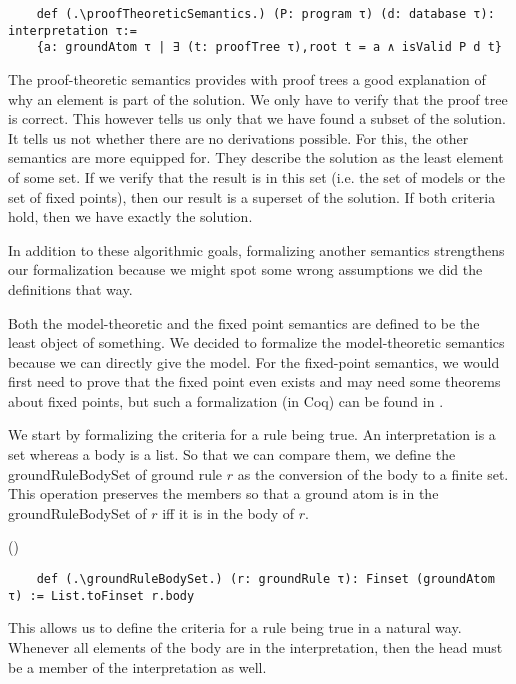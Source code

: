 \begin{lstlisting}
    def (.\proofTheoreticSemantics.) (P: program τ) (d: database τ): interpretation τ:= 
    {a: groundAtom τ | ∃ (t: proofTree τ),root t = a ∧ isValid P d t}
\end{lstlisting}

The proof-theoretic semantics provides with proof trees a good explanation of why an element is part of the solution. We only have to verify that the proof tree is correct. This however tells us only that we have found a subset of the solution. It tells us not whether there are no derivations possible. For this, the other semantics are more equipped for. They describe the solution as the least element of some set. If we verify that the result is in this set (i.e. the set of models or the set of fixed points), then our result is a superset of the solution. If both criteria hold, then we have exactly the solution.

In addition to these algorithmic goals, formalizing another semantics strengthens our formalization because we might spot some wrong assumptions we did the definitions that way.

Both the model-theoretic and the fixed point semantics are defined to be the least object of something. We decided to formalize the model-theoretic semantics because we can directly give the model. For the fixed-point semantics, we would first need to prove that the fixed point even exists and may need some theorems about fixed points, but such a formalization (in Coq) can be found in \cite{datalogCoq}.

We start by formalizing the criteria for a rule being true. An interpretation is a set whereas a body is a list. So that we can compare them, we define the groundRuleBodySet of ground rule $r$ as the conversion of the body to a finite set. This operation preserves the members so that a ground atom is in the groundRuleBodySet of $r$ iff it is in the body of $r$.


(\groundRuleBodySetiffgroundRuleBody)


\begin{lstlisting}
    def (.\groundRuleBodySet.) (r: groundRule τ): Finset (groundAtom τ) := List.toFinset r.body
\end{lstlisting}

This allows us to define the criteria for a rule being true in a natural way. Whenever all elements of the body are in the interpretation, then the head must be a member of the interpretation as well.

